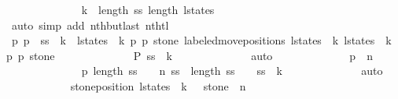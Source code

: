 \begin{isabellebody}
\ \ \ \ \ \ \ \ \ \ \ \ \isamarkupfalse%
\ {\isacharbackquoteopen}k\ {\isacharless}\ length\ {\isacharquery}ss{\isacharbackquoteclose}\ {\isacharbackquoteopen}length\ l{\isacharunderscore}states\ {\isasymge}\ {}{\isacharbackquoteclose}\isanewline
\ \ \ \ \ \ \ \ \ \ \ \ \isamarkupfalse%
\ {\isacharparenleft}auto\ simp\ add{\isacharcolon}\ nth{\isacharunderscore}butlast\ nth{\isacharunderscore}tl{\isacharparenright}\isanewline
\ \ \ \ \ \ \ \ \ \ \isamarkupfalse%
\ \isamarkupfalse%
\ p{}{\isacharprime}\ p{}{\isacharprime}\ \ {\isachardoublequoteopen}{\isacharquery}ss\ {\isacharbang}\ k\ {\isacharequal}\ {\isacharparenleft}l{\isacharunderscore}states\ {\isacharbang}\ k{\isacharcomma}\ p{}{\isacharprime}{\isacharcomma}\ p{}{\isacharprime}{\isacharcomma}\ stone{\isacharparenright}{\isachardoublequoteclose}\ {\isachardoublequoteopen}labeled{\isacharunderscore}move{\isacharunderscore}positions\ {\isacharparenleft}l{\isacharunderscore}states\ {\isacharbang}\ k{\isacharparenright}\ {\isacharparenleft}l{\isacharunderscore}states\ {\isacharbang}\ {\isacharparenleft}k{\isacharplus}{}{\isacharparenright}{\isacharparenright}\ {\isacharequal}\ {\isacharparenleft}p{}{\isacharprime}{\isacharcomma}\ p{}{\isacharprime}{\isacharcomma}\ stone{\isacharparenright}{\isachardoublequoteclose}\isanewline
\ \ \ \ \ \ \ \ \ \ \ \ \isamarkupfalse%
\ {\isacharbackquoteopen}{\isacharquery}P\ {\isacharparenleft}{\isacharquery}ss\ {\isacharbang}\ k{\isacharparenright}{\isacharbackquoteclose}\isanewline
\ \ \ \ \ \ \ \ \ \ \ \ \isamarkupfalse%
\ auto\isanewline
\ \ \ \ \ \ \ \ \ \ \isamarkupfalse%
\ \isamarkupfalse%
\ {\isachardoublequoteopen}p{}{\isacharprime}\ {\isasymnoteq}\ n{\isachardoublequoteclose}\isanewline
\ \ \ \ \ \ \ \ \ \ \ \ \isamarkupfalse%
\ {\isacharbackquoteopen}{\isacharquery}p{}\ {\isacharparenleft}length\ ss\ {\isacharminus}\ {}{\isacharparenright}\ {\isasymnoteq}\ n{\isacharbackquoteclose}\ {\isacharbackquoteopen}ss\ {\isacharbang}\ {\isacharparenleft}length\ ss\ {\isacharminus}\ {}{\isacharparenright}\ {\isacharequal}\ {\isacharquery}ss\ {\isacharbang}\ k{\isacharbackquoteclose}\isanewline
\ \ \ \ \ \ \ \ \ \ \ \ \isamarkupfalse%
\ auto\isanewline
\ \ \ \ \ \ \ \ \ \ \isamarkupfalse%
\ {\isachardoublequoteopen}stone{\isacharunderscore}position\ {\isacharparenleft}l{\isacharunderscore}states\ {\isacharbang}\ {\isacharparenleft}k\ {\isacharplus}\ {}{\isacharparenright}{\isacharparenright}\ stone\ {\isasymnoteq}\ n{\isachardoublequoteclose}\isanewline

\end{isabellebody}
